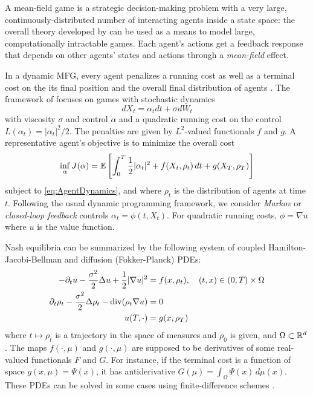 \documentclass[../report.tex]{subfiles}
\begin{document}
A mean-field game \cite{LASRY2006619,LASRY2006679} is a strategic decision-making problem with a very large, continuously-distributed number of interacting agents inside a state space: the overall theory developed by \citeauthor{LASRY2006619} can be used as a means to model large, computationally intractable games. Each agent's actions get a feedback response that depends on other agents' states and actions through a \textit{mean-field} effect.

In a dynamic MFG, every agent penalizes a running cost as well as a terminal cost on the its final position and the overall final distribution of agents \cite{LASRY2006679}.
The framework of \cites{benamou:hal-01295299}{benamou2018entropy} focuses on games with stochastic dynamics
\begin{equation}\label{eq:AgentDynamics}
	dX_t = \alpha_tdt + \sigma dW_t
\end{equation}
with viscosity $\sigma$ and control $\alpha$ and a quadratic running cost on the control $L(\alpha_t) = |\alpha_t|^2/2$. The penalties are given by $L^2$-valued functionals $f$ and $g$. A representative agent's objective is to minimize the overall cost
\begin{equation}\label{eq:ControlObjective}
	\inf_{\alpha} J(\alpha) = \mathbb{E}\left[
	\int_0^T \frac{1}{2}|\alpha_t|^2 + f(X_t, \rho_t) \,dt + g(X_T, \rho_T)
	\right]
\end{equation}
subject to \cref{eq:AgentDynamics}, and where $\rho_t$ is the distribution of agents at time $t$. Following the usual dynamic programming framework, we consider \textit{Markov} or \textit{closed-loop feedback} controls $\alpha_t = \phi(t, X_t)$. For quadratic running costs, $\phi = \nabla u$ where $u$ is the value function.

Nash equilibria can be summarized by the following system of coupled Hamilton-Jacobi-Bellman and diffusion (Fokker-Planck) PDEs:
\begin{subequations}\label{eq:QuadraticMFG}
	\begin{align}\label{eq:MFGHJB}
	-\partial_t u - \frac{\sigma^2}{2}\Delta u + \frac12|\nabla u|^2 &= f(x, \rho_t), \quad (t,x) \in  (0, T) \times \Omega \\\label{eq:MFGKolmo}
	\partial_t \rho_t - \frac{\sigma^2}{2}\Delta\rho_t - \operatorname{div}(\rho_t \nabla u) &= 0 \\
	u(T, \cdot) &= g(x, \rho_T)
	\end{align}
\end{subequations}
where $t\mapsto \rho_t$ is a trajectory in the space of measures and $\rho_0$ is given, and $\Omega\subset\mathbb{R}^d$. The maps $f(\cdot, \mu)$ and $g(\cdot, \mu)$ are supposed to be derivatives of some real-valued functionals $F$ and $G$. For instance, if the terminal cost is a function of space $g(x, \mu) = \Psi(x)$, it has antiderivative $G(\mu) = \int_\Omega \Psi(x) \,d\mu(x)$.
These PDEs can be solved in some cases using finite-difference schemes \cite{achdou:hal-01456506}.
\end{document}

